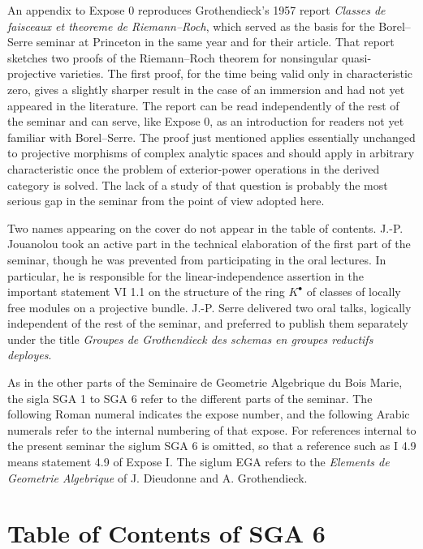\documentclass[11pt]{article}
\theoremstyle{plain}
\theoremstyle{definition}
\theoremstyle{remark}
\begin{document}
An appendix to Expose 0 reproduces Grothendieck's 1957 report \emph{Classes de faisceaux et theoreme de Riemann--Roch}, which served as the basis for the Borel--Serre seminar at Princeton in the same year and for their article. That report sketches two proofs of the Riemann--Roch theorem for nonsingular quasi-projective varieties. The first proof, for the time being valid only in characteristic zero, gives a slightly sharper result in the case of an immersion and had not yet appeared in the literature. The report can be read independently of the rest of the seminar and can serve, like Expose 0, as an introduction for readers not yet familiar with Borel--Serre. The proof just mentioned applies essentially unchanged to projective morphisms of complex analytic spaces and should apply in arbitrary characteristic once the problem of exterior-power operations in the derived category is solved. The lack of a study of that question is probably the most serious gap in the seminar from the point of view adopted here.

Two names appearing on the cover do not appear in the table of contents. J.-P. Jouanolou took an active part in the technical elaboration of the first part of the seminar, though he was prevented from participating in the oral lectures. In particular, he is responsible for the linear-independence assertion in the important statement VI 1.1 on the structure of the ring $K^{\bullet}$ of classes of locally free modules on a projective bundle. J.-P. Serre delivered two oral talks, logically independent of the rest of the seminar, and preferred to publish them separately under the title \emph{Groupes de Grothendieck des schemas en groupes reductifs deployes}.

As in the other parts of the Seminaire de Geometrie Algebrique du Bois Marie, the sigla SGA 1 to SGA 6 refer to the different parts of the seminar. The following Roman numeral indicates the expose number, and the following Arabic numerals refer to the internal numbering of that expose. For references internal to the present seminar the siglum SGA 6 is omitted, so that a reference such as I 4.9 means statement 4.9 of Expose I. The siglum EGA refers to the \emph{Elements de Geometrie Algebrique} of J. Dieudonne and A. Grothendieck.

\section*{Table of Contents of SGA 6}
\end{document}
